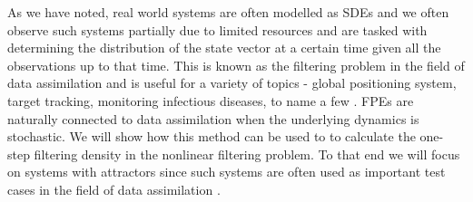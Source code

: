 As we have noted, real world systems are often modelled as SDEs and we often observe such systems partially due to limited resources and are tasked with determining the distribution of the state vector at a certain time given all the observations up to that time. This is known as the filtering problem in the field of data assimilation and is useful for a variety of topics - global positioning system, target tracking, monitoring infectious diseases, to name a few \cite{sarkka2023bayesian}. FPEs are naturally connected to data assimilation when the underlying dynamics is stochastic. We will show how this method can be used to to calculate the one-step filtering density in the nonlinear filtering problem. To that end we will focus on systems with attractors since such systems are often used as important test cases in the field of data assimilation \cite{carrassi2022data}.


